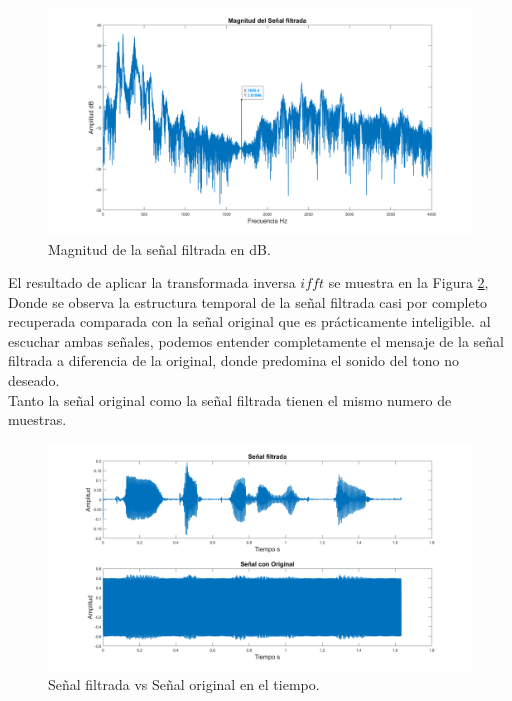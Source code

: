 \documentclass[letterpaper,onecolumn,10pt,journal,final]{IEEEtran}
\begin{document}
\begin{figure}[H]
\centering
\includegraphics[width=1 \linewidth]{Figuras/IIIc.png}
\caption{Magnitud de la señal filtrada en dB.}
\label{IIIc}
\end{figure} 

El resultado de aplicar la transformada inversa $ifft$ se muestra en la Figura \ref{IIId}, Donde se observa la estructura temporal de la señal filtrada casi por completo recuperada comparada con la señal original que es prácticamente inteligible. al escuchar ambas señales, podemos entender completamente el mensaje de la señal filtrada a diferencia de la original, donde predomina el sonido del tono no deseado.\\

Tanto la señal original como la señal filtrada tienen el mismo numero de muestras. %

\begin{figure}[H]
\centering
\includegraphics[width=1 \linewidth]{Figuras/IIId.png}
\caption{Señal filtrada vs Señal original en el tiempo.}
\label{IIId}
\end{figure} 
\end{document}
